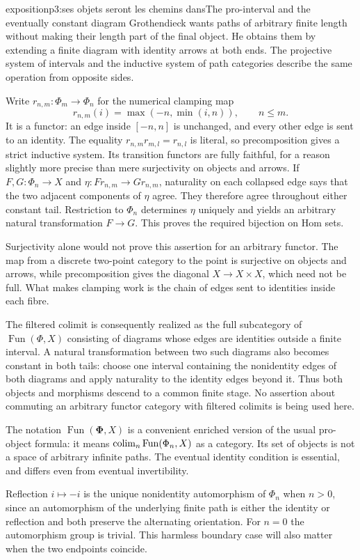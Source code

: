 \begin{dcomment}{exposition}{p3:ses objets seront les chemins dans}{The pro-interval and the eventually constant diagram}
Grothendieck wants paths of arbitrary finite length without making their length part of the final object. He obtains them by extending a finite diagram with identity arrows at both ends. The projective system of intervals and the inductive system of path categories describe the same operation from opposite sides.

Write $r_{n,m}:\Phi_m\to\Phi_n$ for the numerical clamping map
\[
 r_{n,m}(i)=\max(-n,\min(i,n)),\qquad n\leq m.
\]
It is a functor: an edge inside $[-n,n]$ is unchanged, and every other edge is sent to an identity. The equality $r_{n,m}r_{m,l}=r_{n,l}$ is literal, so precomposition gives a strict inductive system. Its transition functors are fully faithful, for a reason slightly more precise than mere surjectivity on objects and arrows. If $F,G:\Phi_n\to X$ and $\eta:Fr_{n,m}\to Gr_{n,m}$, naturality on each collapsed edge says that the two adjacent components of $\eta$ agree. They therefore agree throughout either constant tail. Restriction to $\Phi_n$ determines $\eta$ uniquely and yields an arbitrary natural transformation $F\to G$. This proves the required bijection on Hom sets.

Surjectivity alone would not prove this assertion for an arbitrary functor. The map from a discrete two-point category to the point is surjective on objects and arrows, while precomposition gives the diagonal $X\to X\times X$, which need not be full. What makes clamping work is the chain of edges sent to identities inside each fibre.

The filtered colimit is consequently realized as the full subcategory of $\operatorname{Fun}(\Phi,X)$ consisting of diagrams whose edges are identities outside a finite interval. A natural transformation between two such diagrams also becomes constant in both tails: choose one interval containing the nonidentity edges of both diagrams and apply naturality to the identity edges beyond it. Thus both objects and morphisms descend to a common finite stage. No assertion about commuting an arbitrary functor category with filtered colimits is being used here.

The notation $\operatorname{Fun}(\boldsymbol\Phi,X)$ is a convenient enriched version of the usual pro-object formula: it means $\mathop{\rm colim}_n\operatorname{Fun}(\Phi_n,X)$ as a category. Its set of objects is not a space of arbitrary infinite paths. The eventual identity condition is essential, and differs even from eventual invertibility.

Reflection $i\mapsto-i$ is the unique nonidentity automorphism of $\Phi_n$ when $n>0$, since an automorphism of the underlying finite path is either the identity or reflection and both preserve the alternating orientation. For $n=0$ the automorphism group is trivial. This harmless boundary case will also matter when the two endpoints coincide.
\end{dcomment}

